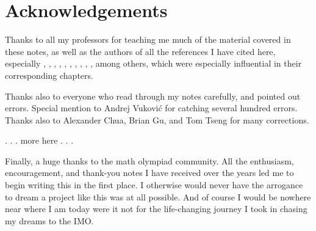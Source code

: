 \section*{Acknowledgements}

Thanks to all my professors for teaching me much of the
material covered in these notes,
as well as the authors of all the references I have cited here,
especially \cite{ref:55a}, \cite{ref:msci}, \cite{ref:dartmouth},
\cite{ref:oggier_NT}, \cite{ref:manifolds}, \cite{ref:gathmann},
\cite{ref:18-435}, \cite{ref:etingof}, \cite{ref:hatcher}, \cite{ref:145a},
among others, which were especially influential in their corresponding chapters.

Thanks also to everyone who read through my notes carefully, and pointed out errors.
Special mention to Andrej Vukovi\'c for catching several hundred errors.
Thanks also to Alexander Chua, Brian Gu, and Tom Tseng for many corrections.

. . . more here . . .

Finally, a huge thanks to the math olympiad community.
All the enthusiasm, encouragement, and thank-you notes I have received
over the years led me to begin writing this in the first place.
I otherwise would never have the arrogance to dream a project like this
was at all possible.
And of course I would be nowhere near where I am today were it not for the
life-changing journey I took in chasing my dreams to the IMO.
